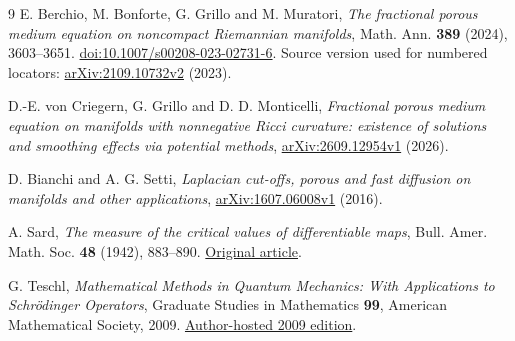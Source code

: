 \documentclass[11pt]{article}
\theoremstyle{definition}
\theoremstyle{remark}
\begin{document}
\begin{thebibliography}{9}
E. Berchio, M. Bonforte, G. Grillo and M. Muratori,
\emph{The fractional porous medium equation on noncompact
Riemannian manifolds}, Math. Ann. \textbf{389} (2024), 3603--3651.
\href{https://doi.org/10.1007/s00208-023-02731-6}{doi:10.1007/s00208-023-02731-6}.
Source version used for numbered locators:
\href{https://arxiv.org/abs/2109.10732v2}{arXiv:2109.10732v2} (2023).

D.-E. von Criegern, G. Grillo and D. D. Monticelli,
\emph{Fractional porous medium equation on manifolds with nonnegative
Ricci curvature: existence of solutions and smoothing effects via
potential methods},
\href{https://arxiv.org/abs/2609.12954v1}{arXiv:2609.12954v1} (2026).

D. Bianchi and A. G. Setti,
\emph{Laplacian cut-offs, porous and fast diffusion on manifolds
and other applications},
\href{https://arxiv.org/abs/1607.06008v1}{arXiv:1607.06008v1} (2016).

A. Sard,
\emph{The measure of the critical values of differentiable maps},
Bull. Amer. Math. Soc. \textbf{48} (1942), 883--890.
\href{https://webhomes.maths.ed.ac.uk/~v1ranick/papers/sard.pdf}{Original article}.

G. Teschl,
\emph{Mathematical Methods in Quantum Mechanics:
With Applications to Schr\"odinger Operators},
Graduate Studies in Mathematics \textbf{99},
American Mathematical Society, 2009.
\href{https://www.mat.univie.ac.at/~gerald/ftp/book-schroe/schroe.pdf}{Author-hosted 2009 edition}.
\end{thebibliography}
\end{document}
